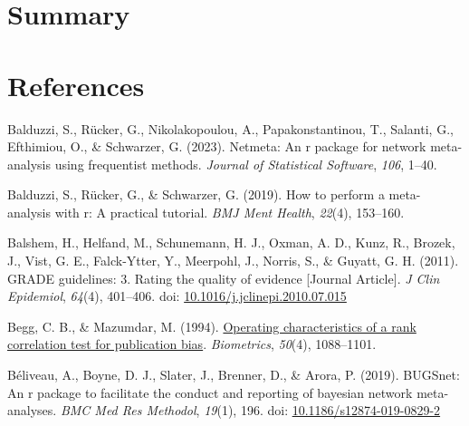 \documentclass[
  letterpaper,
  DIV=11,
  numbers=noendperiod]{scrreprt}
\newlength{\cslhangindent}
\newlength{\cslentryspacingunit} %
\newenvironment{CSLReferences}[2] %
 {%
  \setlength{\parindent}{0pt}
  \ifodd #1
  \let\oldpar\par
  \def\par{\hangindent=\cslhangindent\oldpar}
  \fi
  \setlength{\parskip}{#2\cslentryspacingunit}
 }%
 {}
\begin{document}

\hypertarget{summary}{%
\chapter{Summary}\label{summary}}


\hypertarget{references}{%
\chapter*{References}\label{references}}


\hypertarget{refs}{}
\begin{CSLReferences}{1}{0}
\leavevmode{}%
Balduzzi, S., Rücker, G., Nikolakopoulou, A., Papakonstantinou, T.,
Salanti, G., Efthimiou, O., \& Schwarzer, G. (2023). Netmeta: An r
package for network meta-analysis using frequentist methods.
\emph{Journal of Statistical Software}, \emph{106}, 1--40.

\leavevmode{}%
Balduzzi, S., Rücker, G., \& Schwarzer, G. (2019). How to perform a
meta-analysis with r: A practical tutorial. \emph{BMJ Ment Health},
\emph{22}(4), 153--160.

\leavevmode{}%
Balshem, H., Helfand, M., Schunemann, H. J., Oxman, A. D., Kunz, R.,
Brozek, J., Vist, G. E., Falck-Ytter, Y., Meerpohl, J., Norris, S., \&
Guyatt, G. H. (2011). GRADE guidelines: 3. Rating the quality of
evidence {[}Journal Article{]}. \emph{J Clin Epidemiol}, \emph{64}(4),
401--406. doi:
\href{https://doi.org/10.1016/j.jclinepi.2010.07.015}{10.1016/j.jclinepi.2010.07.015}

\leavevmode{}%
Begg, C. B., \& Mazumdar, M. (1994).
\href{https://www.ncbi.nlm.nih.gov/pubmed/7786990}{Operating
characteristics of a rank correlation test for publication bias}.
\emph{Biometrics}, \emph{50}(4), 1088--1101.

\leavevmode{}%
Béliveau, A., Boyne, D. J., Slater, J., Brenner, D., \& Arora, P.
(2019). BUGSnet: An r package to facilitate the conduct and reporting of
bayesian network meta-analyses. \emph{BMC Med Res Methodol},
\emph{19}(1), 196. doi:
\href{https://doi.org/10.1186/s12874-019-0829-2}{10.1186/s12874-019-0829-2}


\end{CSLReferences}
\end{document}
